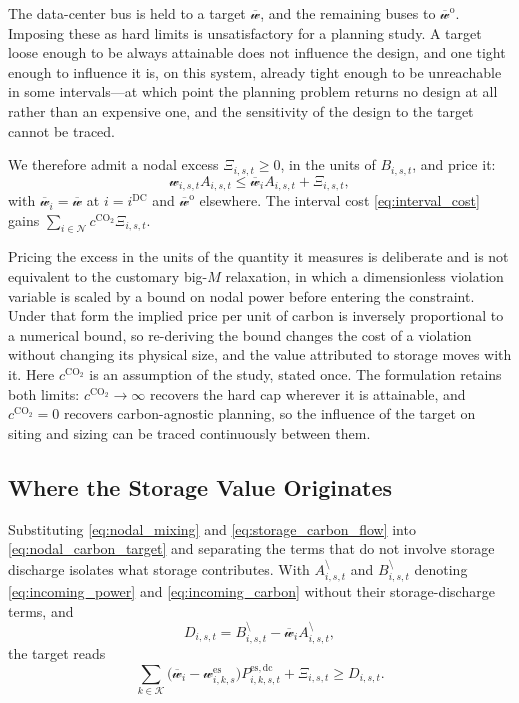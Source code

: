 The data-center bus is held to a target $\overline{\mathscr{w}}$, and the
remaining buses to $\overline{\mathscr{w}}^{\mathrm{o}}$. Imposing these
as hard limits is unsatisfactory for a planning study. A target loose
enough to be always attainable does not influence the design, and one
tight enough to influence it is, on this system, already tight enough to
be unreachable in some intervals---at which point the planning problem
returns no design at all rather than an expensive one, and the
sensitivity of the design to the target cannot be traced.

We therefore admit a nodal excess $\Xi_{i,s,t}\geq0$, in the units of
$B_{i,s,t}$, and price it:
\begin{equation}
\mathscr{w}_{i,s,t}A_{i,s,t}
\leq
\overline{\mathscr{w}}_i A_{i,s,t}
+
\Xi_{i,s,t},
\label{eq:nodal_carbon_target}
\end{equation}
with $\overline{\mathscr{w}}_i=\overline{\mathscr{w}}$ at
$i=i^{\mathrm{DC}}$ and $\overline{\mathscr{w}}^{\mathrm{o}}$ elsewhere.
The interval cost \eqref{eq:interval_cost} gains
$\sum_{i\in\mathcal{N}}c^{\mathrm{CO_2}}\Xi_{i,s,t}$.

Pricing the excess in the units of the quantity it measures is deliberate
and is not equivalent to the customary big-$M$ relaxation, in which a
dimensionless violation variable is scaled by a bound on nodal power
before entering the constraint. Under that form the implied price per
unit of carbon is inversely proportional to a numerical bound, so
re-deriving the bound changes the cost of a violation without changing
its physical size, and the value attributed to storage moves with it.
Here $c^{\mathrm{CO_2}}$ is an assumption of the study, stated once. The
formulation retains both limits: $c^{\mathrm{CO_2}}\!\to\!\infty$ recovers
the hard cap wherever it is attainable, and $c^{\mathrm{CO_2}}\!=\!0$
recovers carbon-agnostic planning, so the influence of the target on
siting and sizing can be traced continuously between them.

\subsection{Where the Storage Value Originates}
\label{sec:value_origin}

Substituting \eqref{eq:nodal_mixing} and \eqref{eq:storage_carbon_flow}
into \eqref{eq:nodal_carbon_target} and separating the terms that do not
involve storage discharge isolates what storage contributes. With
$A_{i,s,t}^{\setminus}$ and $B_{i,s,t}^{\setminus}$ denoting
\eqref{eq:incoming_power} and \eqref{eq:incoming_carbon} without their
storage-discharge terms, and
\begin{equation}
D_{i,s,t}
=
B_{i,s,t}^{\setminus}
-
\overline{\mathscr{w}}_i A_{i,s,t}^{\setminus},
\label{eq:carbon_deficit}
\end{equation}
the target reads
\begin{equation}
\sum_{k\in\mathcal{K}}
\bigl(\overline{\mathscr{w}}_i-\mathscr{w}_{i,k,s}^{\mathrm{es}}\bigr)
P_{i,k,s,t}^{\mathrm{es,dc}}
+
\Xi_{i,s,t}
\geq
D_{i,s,t}.
\label{eq:carbon_gap_priced}
\end{equation}

